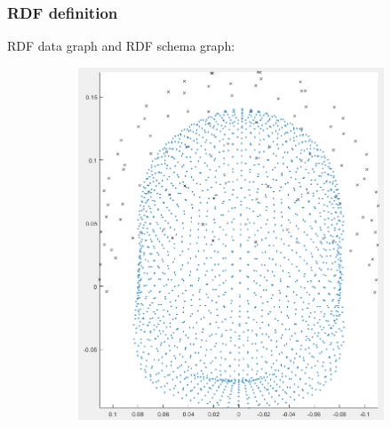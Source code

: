 \documentclass{beamer}
\numberwithin{figure}{section}
\numberwithin{equation}{section}
\begin{document}
\section{}
\begin{frame}
 \frametitle{RDF definition}
 	RDF data graph and RDF schema graph:
 	\begin{figure}[h]
        \begin{subfigure}[h]{0.4\linewidth} 
            \includegraphics[width=\textwidth]{pictures/megsen}
            \label{fig:rdf_graph}
        \end{subfigure}       
        \begin{subfigure}[h]{0.33\linewidth} 

\end{subfigure}
\end{figure}
\end{frame}
\end{document}
